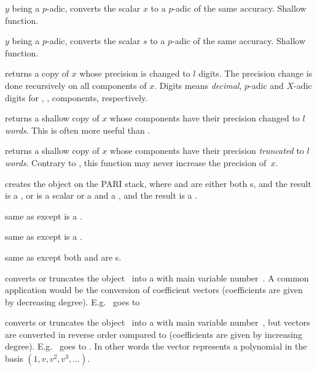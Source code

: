  $y$ being a $p$-adic, converts the scalar $x$
to a $p$-adic of the same accuracy. Shallow function.

 $y$ being a $p$-adic, converts the scalar $s$
to a $p$-adic of the same accuracy. Shallow function.

 returns a copy of $x$ whose precision is
changed to $l$ digits. The precision change is done recursively on all
components of $x$. Digits means \emph{decimal}, $p$-adic and $X$-adic digits
for , ,  components, respectively.

 returns a shallow copy of $x$ whose
 components have their precision changed to $l$ \emph{words}. This
is often more useful than .

 returns a shallow copy of $x$ whose
 components have their precision \emph{truncated} to $l$
\emph{words}. Contrary to , this function may never increase
the precision of~$x$.


 creates the object  on
the PARI stack, where  and  are either both s, and the
result is a , or  is a scalar or a  and  a
, and the result is a .

 same as  except  is a
.

 same as  except  is a
.

 same as  except both
 and  are s.


 converts or truncates the object~
into a  with main variable number~. A common application
would be the conversion of coefficient vectors (coefficients are given by
decreasing degree). E.g.~\kbd{[2,3]} goes to 

 converts or truncates the object~
into a  with main variable number~, but vectors are converted
in reverse order compared to  (coefficients are given by
increasing degree). E.g.~\kbd{[2,3]} goes to . In other words
the vector represents a polynomial in the basis $(1,v,v^2,v^3,\dots)$.

